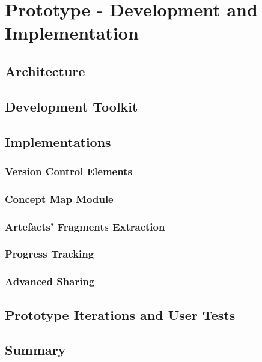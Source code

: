 \chapter{Prototype - Development and Implementation\label{cha:prototype}}

\section{Architecture}

\section{Development Toolkit}

\section{Implementations}

\subsection{Version Control Elements}

\subsection{Concept Map Module}
 
\subsection{Artefacts' Fragments Extraction}

\subsection{Progress Tracking}

\subsection{Advanced Sharing}

\section{Prototype Iterations and User Tests}
 
\section{Summary}